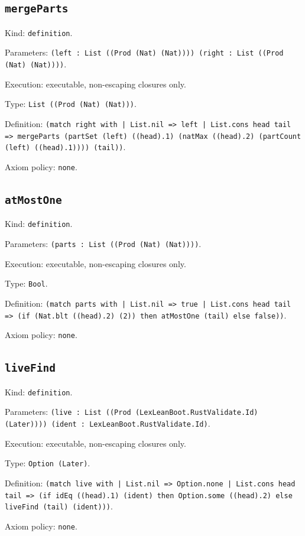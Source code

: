 \documentclass[11pt]{article}
\begin{document}
\subsection*{\texttt{mergeParts}}
\noindent Kind: \texttt{definition}.\par
\noindent Parameters: \texttt{(left : List ((Prod (Nat) (Nat)))) (right : List ((Prod (Nat) (Nat))))}.\par
\noindent Execution: executable, non-escaping closures only.\par
\noindent Type: \texttt{List ((Prod (Nat) (Nat)))}.\par
\noindent Definition: \texttt{(match right with | List.nil => left | List.cons head tail => mergeParts (partSet (left) ((head).1) (natMax ((head).2) (partCount (left) ((head).1)))) (tail))}.\par
\noindent Axiom policy: \texttt{none}.\par
\subsection*{\texttt{atMostOne}}
\noindent Kind: \texttt{definition}.\par
\noindent Parameters: \texttt{(parts : List ((Prod (Nat) (Nat))))}.\par
\noindent Execution: executable, non-escaping closures only.\par
\noindent Type: \texttt{Bool}.\par
\noindent Definition: \texttt{(match parts with | List.nil => true | List.cons head tail => (if (Nat.blt ((head).2) (2)) then atMostOne (tail) else false))}.\par
\noindent Axiom policy: \texttt{none}.\par
\subsection*{\texttt{liveFind}}
\noindent Kind: \texttt{definition}.\par
\noindent Parameters: \texttt{(live : List ((Prod (LexLeanBoot.RustValidate.Id) (Later)))) (ident : LexLeanBoot.RustValidate.Id)}.\par
\noindent Execution: executable, non-escaping closures only.\par
\noindent Type: \texttt{Option (Later)}.\par
\noindent Definition: \texttt{(match live with | List.nil => Option.none | List.cons head tail => (if idEq ((head).1) (ident) then Option.some ((head).2) else liveFind (tail) (ident)))}.\par
\noindent Axiom policy: \texttt{none}.\par
\end{document}
